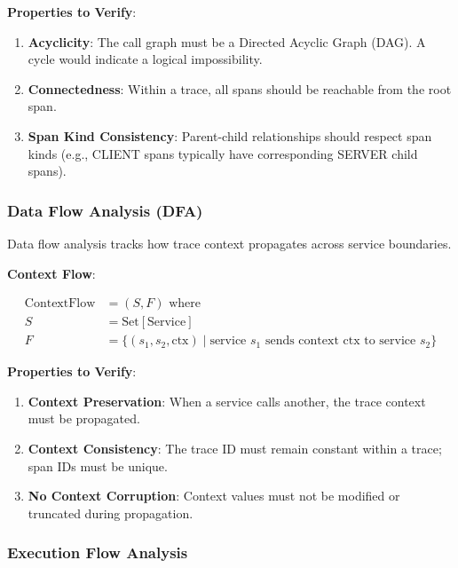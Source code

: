 \textbf{Properties to Verify}:

\begin{enumerate}
\item \textbf{Acyclicity}: The call graph must be a Directed Acyclic Graph (DAG). A cycle would indicate a logical impossibility.

\item \textbf{Connectedness}: Within a trace, all spans should be reachable from the root span.

\item \textbf{Span Kind Consistency}: Parent-child relationships should respect span kinds (e.g., CLIENT spans typically have corresponding SERVER child spans).
\end{enumerate}

\subsubsection{Data Flow Analysis (DFA)}

Data flow analysis tracks how trace context propagates across service boundaries.

\textbf{Context Flow}:

\begin{align*}
\text{ContextFlow} &= (S, F) \text{ where} \\
S &= \text{Set}[\text{Service}] \\
F &= \{(s_1, s_2, \text{ctx}) \mid \text{service } s_1 \text{ sends context ctx to service } s_2\}
\end{align*}

\textbf{Properties to Verify}:

\begin{enumerate}
\item \textbf{Context Preservation}: When a service calls another, the trace context must be propagated.

\item \textbf{Context Consistency}: The trace ID must remain constant within a trace; span IDs must be unique.

\item \textbf{No Context Corruption}: Context values must not be modified or truncated during propagation.
\end{enumerate}

\subsubsection{Execution Flow Analysis}


